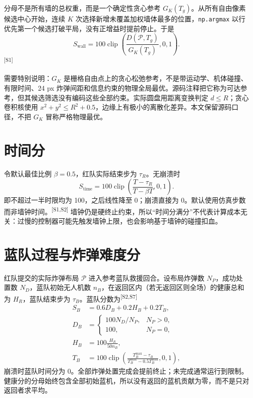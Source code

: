 \documentclass[UTF8,11pt]{ctexart}
\newcommand{\src}[1]{\textsuperscript{\textcolor{blue!65!black}{[#1]}}}
\newcommand{\clip}{\operatorname{clip}}
\begin{document}
分母不是所有墙的总权重，而是一个确定性贪心参考 $G_K(T_g)$。从所有自由像素候选中心开始，连续 $K$ 次选择新增未覆盖加权墙体最多的位置，\texttt{np.argmax} 以行优先第一个候选打破平局，没有正增益时提前停止。于是
\begin{equation}
S_{\mathrm{wall}}=100\clip\left(\frac{D(\mathcal P,T_g)}{G_K(T_g)},0,1\right).
\label{eq:wall-score}
\end{equation}
\src{S1}

需要特别说明：$G_K$ 是栅格自由点上的贪心松弛参考，不是带运动学、机体碰撞、有限时间、24 px 炸弹间距和信息约束的物理全局最优。源码注释把它称为可达参考，但其候选筛选没有编码这些全部约束。实际圆盘用距离变换判定 $d\le R$；贪心卷积核使用 $x^2+y^2\le R^2+0.5$，边缘上有极小的离散化差异。本文保留源码口径，不把 $G_K$ 冒称严格物理最优。

\section{时间分}

令默认最佳比例 $\beta=0.5$，红队实际结束步为 $\tau_R$。无崩溃时
\begin{equation}
S_{\mathrm{time}}=100\clip\left(\frac{T-\tau_R}{T-\beta T},0,1\right).
\label{eq:time-score}
\end{equation}
即不超过一半时限均为 100，之后线性降至 0；崩溃直接为 0。默认使用仿真步数而非墙钟时间。\src{S1,S2} 墙钟仍是硬终止约束，所以“时间分满分”不代表计算成本无关：过慢的控制器可能先触发墙钟上限，也会影响基于墙钟的碰撞扣血。

\section{蓝队过程与炸弹难度分}

红队提交的实际炸弹布局 $\mathcal P$ 进入参考蓝队救援回合。设布局炸弹数 $N_P$，成功处置数 $N_D$，蓝队初始无人机数 $n_B$，在返回区内（若无返回区则全场）的健康总和为 $H_R$，蓝队结束步为 $\tau_B$。蓝队分数为\src{S2,S7}
\begin{align}
S_B&=0.6D_B+0.2H_B+0.2T_B,\\
D_B&=\begin{cases}100N_D/N_P,&N_P>0,\\100,&N_P=0,\end{cases}\\
H_B&=100\frac{H_R}{50n_B},\\
T_B&=100\clip\left(\frac{T_B^{\max}-\tau_B}{T_B^{\max}-0.5T_B^{\max}},0,1\right),
\end{align}
崩溃时蓝队时间分为 0。全部炸弹处置完成会提前终止；未完成通常运行到限制。健康分的分母始终包含全部初始蓝机，所以没有返回的蓝机贡献为零，而不是只对返回者求平均。
\end{document}
